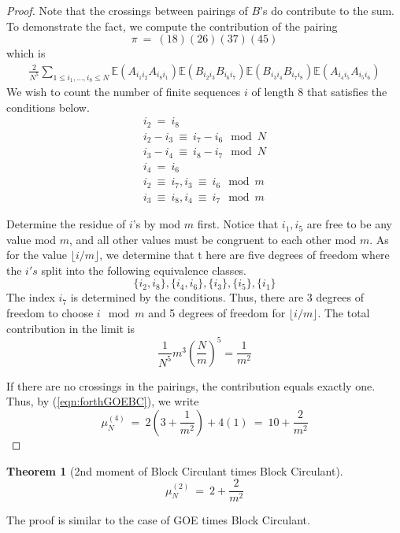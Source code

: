\documentclass{article}
\newtheorem{theorem}{Theorem}
\begin{document}
\begin{proof}
Note that the crossings between pairings of $B$'s do contribute to the sum. 
To demonstrate the fact, we compute the contribution of the pairing 
\[
    \pi \ = \ (18)(26)(37)(45)
\] which is 
\begin{equation}
    \begin{split}
\frac{2}{N^5} \sum_{1 \leq i_1, \dots,  i_8 \leq N} 
\mathbb{E} \left( A_{i_1i_2} A_{i_8i_1}\right)
\mathbb{E}
\left(B_{i_2i_3} B_{i_6i_7}\right) 
\mathbb{E}
\left(B_{i_3i_4} B_{i_7i_8}  \right)
\mathbb{E}
\left(
A_{i_4i_5} A_{i_5i_6}  
\right)
    \end{split}
\end{equation}
We wish to count the number of finite sequences $i$ of length 
8 that satisfies the conditions below. 
\begin{eqnarray}
i_2 \ = \ i_8 \\
i_2 - i_3 \ \equiv \ i_7 - i_6 \mod N\\ 
i_3 - i_4 \ \equiv \ i_8 - i_7 \mod N\\
i_4 \ = \ i_6 \\ 
i_2 \ \equiv \ i_7, i_3 \ \equiv \ i_6 \mod m \\ 
i_3 \ \equiv \ i_8, i_4 \ \equiv \ i_7 \mod m
\end{eqnarray}

Determine the residue of $i$'s by mod $m$ first. Notice that $i_1, i_5$ 
are free to be any value mod $m$, and all other values must be congruent 
to each other mod $m$. As for the value $\lfloor i/m\rfloor$, we determine that t
here are five degrees of freedom where the $i's$ split into the following 
equivalence classes. 
\[
\{
    i_2, i_8\}, \{i_4, i_6\}, \{i_3\}, \{i_5\}, \{i_1\}
\]
The index $i_7$ is determined by the conditions. 
Thus, there are 3 degrees of freedom to choose $i \mod m$ and 
5 degrees of freedom for $\lfloor i/m \rfloor$. The total contribution 
in the limit is 
\[
    \frac 1 {N^5}m^3 \left(
        \frac N m
    \right)^5 = \frac 1 {m^2}
\]  

If there are no crossings in the pairings, the contribution equals exactly one. 
Thus, by (\ref{eqn:forthGOEBC}), we write 
\[
    \mu_N^{(4)} \ = \ 2 \left(3 + \frac 1{m^2}\right) + 4(1) \ = \ 10 + \frac 2 {m^2}
\]

\end{proof}

\begin{theorem}[2nd moment of Block Circulant times Block Circulant]
    \[
        \mu_N^{(2)} \ =\ 2 + \frac 2 {m^2} 
    \]
\end{theorem}

The proof is similar to the case of GOE times Block Circulant. 
\end{document}
